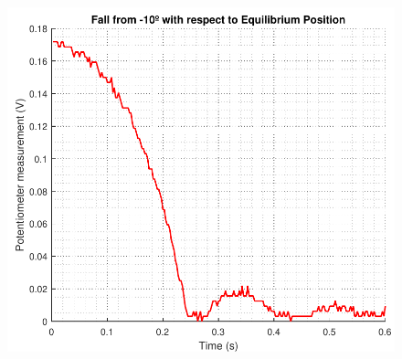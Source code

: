 \begin{minipage}{\linewidth}
\begin{minipage}{0.45\linewidth}
\begin{figure}[H]
			\centering
			\vspace{-.4cm}
			\captionsetup{justification=centering}
			\label{FallRad}
		\end{figure}\vspace{-5mm}
	\end{minipage}
\end{minipage} 

\begin{minipage}{\linewidth}
	\begin{minipage}{0.45\linewidth}
		\begin{figure}[H]
			\includegraphics[scale=.53]{figures/tenDegFallVolt}
			\centering
			\vspace{-.4cm}
			\captionsetup{justification=centering}
			\label{tenDegFallVolt}
		\end{figure}\vspace{-5mm}
	\end{minipage}
	\hspace{0.03\linewidth}
	\begin{minipage}{0.45\linewidth}
		\begin{figure}[H]

\end{figure}
\end{minipage}
\end{minipage}

